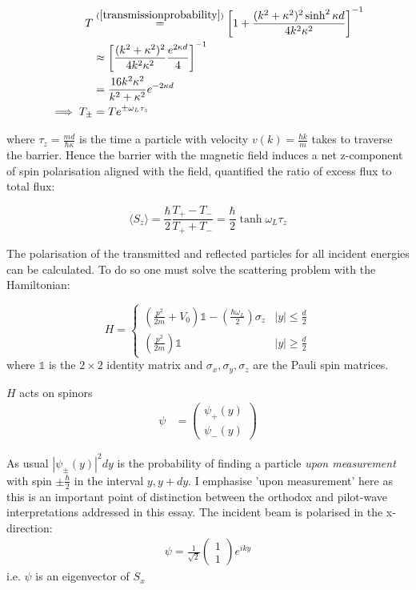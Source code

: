 \documentclass{article}
\begin{document}
\begin{align}
	T &\stackrel{(\ref{transmissionprobability})}{=} \left[1+\frac{(k^2+\kappa^2)^2\sinh^2{\kappa d}}{4k^2\kappa^2}\right]^{-1}\\
	  &\approx \left[\frac{(k^2+\kappa^2)^2}{4k^2\kappa^2}\frac{e^{2\kappa d}}{4}\right]^{-1} \\
	&= \frac{16k^2\kappa^2}{k^2+\kappa^2}e^{-2\kappa d} \\
	\implies T_{\pm} &= Te^{\pm\omega_L \tau_z} 
\end{align}

\noindent where $\tau_z = \frac{md}{\hbar\kappa}$ is the time a particle with velocity $v(k) = \frac{\hbar k}{m}$ takes to traverse the barrier. Hence the barrier with the magnetic field induces a net z-component of spin polarisation aligned with the field, quantified the ratio of excess flux to total flux:

\begin{equation}
	\langle S_z \rangle = \frac{\hbar}{2}\frac{T_{+}-T_{-}}{T_{+}+T_{-}} = \frac{\hbar}{2}\tanh{\omega_L\tau_z}
\end{equation}

\noindent The polarisation of the transmitted and reflected particles for all incident energies can be calculated. To do so one must solve the scattering problem with the Hamiltonian:

\begin{equation}
	H = 
	\begin{cases}
	\left(\frac{p^2}{2m} + V_0\right)\mathbb{1}-\left(\frac{\hbar \omega_L}{2}\right) \sigma_z & |y| \leq \frac{d}{2}\\
	\left(\frac{p^2}{2m}\right)\mathbb{1} & |y| \geq \frac{d}{2}
	\end{cases}
	\end{equation}
where $\mathbb{1}$ is the $2 \times 2$ identity matrix and $\sigma_{x}, \sigma_{y}, \sigma_{z}$ are the Pauli spin matrices.

\noindent $H$ acts on spinors
\begin{align}
	\psi &= \begin{pmatrix}
		\psi_{+}(y) \\
		\psi_{-}(y)
		\end{pmatrix}
\end{align}

As usual $|\psi_{\pm}(y)|^{2}dy$ is the probability of finding a particle \textit{upon measurement} with spin $\pm \frac{\hbar}{2}$ in the interval $y, y+dy$. I emphasise 'upon measurement' here as this is an important point of distinction between the orthodox and pilot-wave interpretations addressed in this essay. The incident beam is polarised in the x-direction:
\begin{align}
	\psi = \frac{1}{\sqrt{2}}
	\begin{pmatrix}
	1\\
	1
	\end{pmatrix}
	e^{iky}
\end{align}
i.e. $\psi$ is an eigenvector of $S_{x}$
\end{document}

